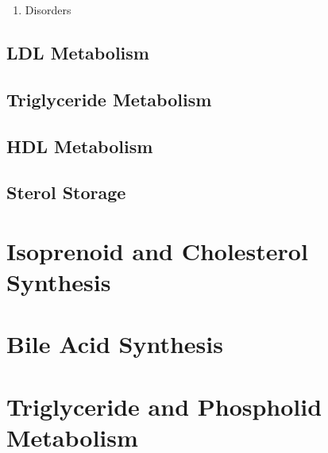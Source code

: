 \documentclass{scrartcl}
\begin{document}
\begin{enumerate}
\item Disorders
\label{sec:org7221d77}
\end{enumerate}

\subsection{LDL Metabolism}
\label{sec:orgc2d9aaf}
\subsection{Triglyceride Metabolism}
\label{sec:org59305c3}
\subsection{HDL Metabolism}
\label{sec:orgb3b48b6}
\subsection{Sterol Storage}
\label{sec:org2e50bfd}
\section{Isoprenoid and Cholesterol Synthesis}
\label{sec:org243dbb4}

\section{Bile Acid Synthesis}
\label{sec:org6d33341}

\section{Triglyceride and Phospholid Metabolism}
\label{sec:org2d71043}
\end{document}
